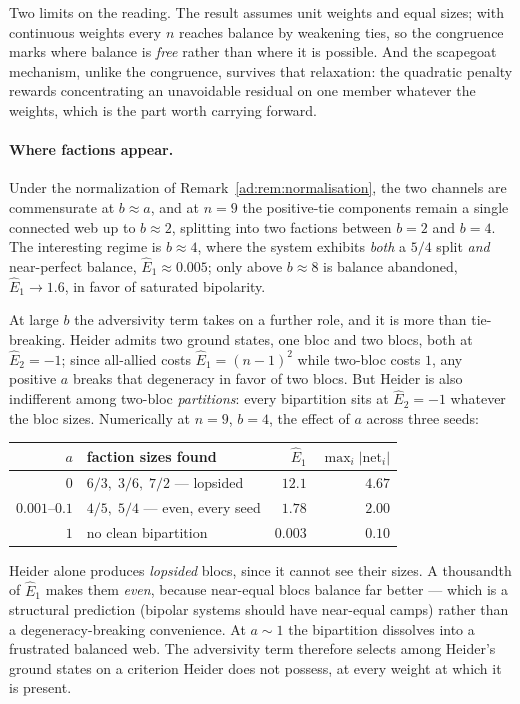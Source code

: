\documentclass[11pt]{article}
\numberwithin{equation}{section}
\theoremstyle{plain}
\theoremstyle{definition}
\theoremstyle{remark}
\begin{document}
Two limits on the reading. The result assumes unit weights and equal
sizes; with continuous weights every $n$ reaches balance by weakening
ties, so the congruence marks where balance is \emph{free} rather than
where it is possible. And the scapegoat mechanism, unlike the
congruence, survives that relaxation: the quadratic penalty rewards
concentrating an unavoidable residual on one member whatever the
weights, which is the part worth carrying forward.

\paragraph{Where factions appear.}\label{ad:rem:factions}
Under the normalization of Remark~\ref{ad:rem:normalisation}, the two
channels are commensurate at $b\approx a$, and at $n=9$ the positive-tie
components remain a single connected web up to $b\approx2$, splitting
into two factions between $b=2$ and $b=4$. The interesting regime is
$b\approx4$, where the system exhibits \emph{both} a $5/4$ split
\emph{and} near-perfect balance, $\hat E_1\approx0.005$; only above
$b\approx8$ is balance abandoned, $\hat E_1\to1.6$, in favor of
saturated bipolarity.

At large $b$ the adversivity term takes on a further role, and it is
more than tie-breaking. Heider admits two ground states, one bloc and
two blocs, both at $\hat E_2=-1$; since all-allied costs
$\hat E_1=(n-1)^{2}$ while two-bloc costs $1$, any positive $a$ breaks
that degeneracy in favor of two blocs. But Heider is also indifferent
among two-bloc \emph{partitions}: every bipartition sits at $\hat E_2=
-1$ whatever the bloc sizes. Numerically at $n=9$, $b=4$, the effect of
$a$ across three seeds:
\begin{center}\small
\begin{tabular}{@{}rlrr@{}}
\toprule
$a$ & faction sizes found & $\hat E_1$ & $\max_i|\mathrm{net}_i|$\\
\midrule
$0$ & $6/3,\;3/6,\;7/2$ --- lopsided & $12.1$ & $4.67$\\
$0.001$--$0.1$ & $4/5,\;5/4$ --- even, every seed & $1.78$ & $2.00$\\
$1$ & no clean bipartition & $0.003$ & $0.10$\\
\bottomrule
\end{tabular}
\end{center}
Heider alone produces \emph{lopsided} blocs, since it cannot see their
sizes. A thousandth of $\hat E_1$ makes them \emph{even}, because
near-equal blocs balance far better --- which is a structural prediction
(bipolar systems should have near-equal camps) rather than a
degeneracy-breaking convenience. At $a\sim1$ the bipartition dissolves
into a frustrated balanced web. The adversivity term therefore selects
among Heider's ground states on a criterion Heider does not possess, at
every weight at which it is present.
\end{document}
